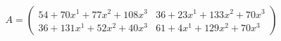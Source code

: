 \documentclass[preview]{standalone}
\begin{document}
\begin{align*}
A = \begin{pmatrix}54 + 70x^{1} + 77x^{2} + 108x^{3} & 36 + 23x^{1} + 133x^{2} + 70x^{3} \\ 36 + 131x^{1} + 52x^{2} + 40x^{3} & 61 + 4x^{1} + 129x^{2} + 70x^{3}\end{pmatrix}
\end{align*}
\end{document}
